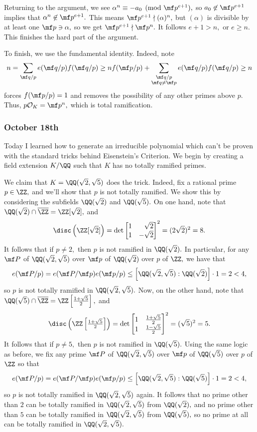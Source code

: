 Returning to the argument, we see $\alpha^n\equiv-a_0\pmod{\mf p^{e+1}},$ so $a_0\not\in\mf p^{e+1}$ implies that $\alpha^n\not\in\mf p^{e+1}.$ This means $\mf p^{e+1}\nmid(\alpha)^n,$ but $(\alpha)$ is divisible by at least one $\mf p\ni\alpha,$ so we get $\mf p^{e+1}\nmid\mf p^n.$ It follows $e+1>n,$ or $e\ge n.$ This finishes the hard part of the argument.

To finish, we use the fundamental identity. Indeed, note
\[n=\sum_{\mf q/p}e(\mf q/p)f(\mf q/p)\ge nf(\mf p/p)+\sum_{\substack{\mf q/p\\\mf q\ne \mf p}}e(\mf q/p)f(\mf q/p)\ge n\]
forces $f(\mf p/p)=1$ and removes the possibility of any other primes above $p.$ Thus, $p\mathcal O_K=\mf p^n,$ which is total ramification.

\subsubsection{October 18th}
Today I learned how to generate an irreducible polynomial which can't be proven with the standard tricks behind Eisenstein's Criterion. We begin by creating a field extension $K/\QQ$ such that $K$ has no totally ramified primes.

We claim that $K=\QQ(\sqrt2,\sqrt5)$ does the trick. Indeed, fix a rational prime $p\in\ZZ,$ and we'll show that $p$ is not totally ramified. We show this by considering the subfields $\QQ(\sqrt2)$ and $\QQ(\sqrt5).$ On one hand, note that $\QQ(\sqrt2)\cap\overline\ZZ=\ZZ[\sqrt2],$ and
\[\disc\left(\ZZ[\sqrt2]\right)=\det\begin{bmatrix}
    1 & \phantom-\sqrt2 \\
    1 & -\sqrt2 \\
\end{bmatrix}^2=(2\sqrt2)^2=8.\]
It follows that if $p\ne2,$ then $p$ is not ramified in $\QQ(\sqrt2).$ In particular, for any $\mf P$ of $\QQ(\sqrt2,\sqrt5)$ over $\mf p$ of $\QQ(\sqrt2)$ over $p$ of $\ZZ,$ we have that
\[e(\mf P/p)=e(\mf P/\mf p)e(\mf p/p)\le\left[\QQ(\sqrt2,\sqrt5):\QQ(\sqrt2)\right]\cdot1=2<4,\]
so $p$ is not totally ramified in $\QQ(\sqrt2,\sqrt5).$ Now, on the other hand, note that $\QQ(\sqrt5)\cap\overline\ZZ=\ZZ\left[\frac{1+\sqrt5}2\right],$ and
\[\disc\left(\ZZ\left[\textstyle\frac{1+\sqrt5}2\right]\right)=\det\begin{bmatrix}
    1 & \frac{1+\sqrt5}2 \\
    1 & \frac{1-\sqrt5}2 \\
\end{bmatrix}^2=(\sqrt5)^2=5.\]
It follows that if $p\ne5,$ then $p$ is not ramified in $\QQ(\sqrt5).$ Using the same logic as before, we fix any prime $\mf P$ of $\QQ(\sqrt2,\sqrt5)$ over $\mf p$ of $\QQ(\sqrt5)$ over $p$ of $\ZZ$ so that
\[e(\mf P/p)=e(\mf P/\mf p)e(\mf p/p)\le\left[\QQ(\sqrt2,\sqrt5):\QQ(\sqrt5)\right]\cdot1=2<4,\]
so $p$ is not totally ramified in $\QQ(\sqrt2,\sqrt5)$ again. It follows that no prime other than $2$ can be totally ramified in $\QQ(\sqrt2,\sqrt5)$ from $\QQ(\sqrt2),$ and no prime other than $5$ can be totally ramified in $\QQ(\sqrt2,\sqrt5)$ from $\QQ(\sqrt5),$ so no prime at all can be totally ramified in $\QQ(\sqrt2,\sqrt5).$

